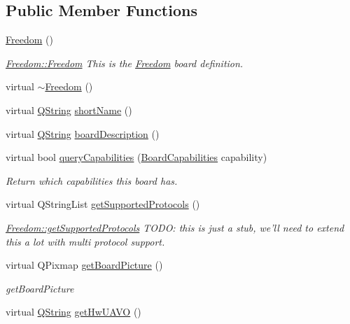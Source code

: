 \subsection*{\-Public \-Member \-Functions}
\begin{DoxyCompactItemize}
\item 
\hyperlink{group___boards___tau_labs_plugin_ga87f0c726ad13819e3918a3e270021fe9}{\-Freedom} ()
\begin{DoxyCompactList}\small\item\em \hyperlink{group___boards___tau_labs_plugin_ga87f0c726ad13819e3918a3e270021fe9}{\-Freedom\-::\-Freedom} \-This is the \hyperlink{class_freedom}{\-Freedom} board definition. \end{DoxyCompactList}\item 
virtual \hyperlink{group___boards___tau_labs_plugin_ga877df717ce1cf3c223d88f54ba538092}{$\sim$\-Freedom} ()
\item 
virtual \hyperlink{group___u_a_v_objects_plugin_gab9d252f49c333c94a72f97ce3105a32d}{\-Q\-String} \hyperlink{group___boards___tau_labs_plugin_ga430b08f4808aa122ae6f93fc1afd1ef5}{short\-Name} ()
\item 
virtual \hyperlink{group___u_a_v_objects_plugin_gab9d252f49c333c94a72f97ce3105a32d}{\-Q\-String} \hyperlink{group___boards___tau_labs_plugin_ga7668e232716f9de134cbcbb2936fda15}{board\-Description} ()
\item 
virtual bool \hyperlink{group___boards___tau_labs_plugin_ga9fe63b3e3b843bb34144942f4faafa3f}{query\-Capabilities} (\hyperlink{group___core_plugin_ga01b09218f2a13aaeee6db007ac6bd967}{\-Board\-Capabilities} capability)
\begin{DoxyCompactList}\small\item\em \-Return which capabilities this board has. \end{DoxyCompactList}\item 
virtual \-Q\-String\-List \hyperlink{group___boards___tau_labs_plugin_ga0666d1e73c1b7042303e2804c849420d}{get\-Supported\-Protocols} ()
\begin{DoxyCompactList}\small\item\em \hyperlink{group___boards___tau_labs_plugin_ga0666d1e73c1b7042303e2804c849420d}{\-Freedom\-::get\-Supported\-Protocols} \-T\-O\-D\-O\-: this is just a stub, we'll need to extend this a lot with multi protocol support. \end{DoxyCompactList}\item 
virtual \-Q\-Pixmap \hyperlink{group___boards___tau_labs_plugin_ga07d3982d49c35a87baa85e32af63e49c}{get\-Board\-Picture} ()
\begin{DoxyCompactList}\small\item\em get\-Board\-Picture \end{DoxyCompactList}\item 
virtual \hyperlink{group___u_a_v_objects_plugin_gab9d252f49c333c94a72f97ce3105a32d}{\-Q\-String} \hyperlink{group___boards___tau_labs_plugin_ga09397e9d9712878ddda4020b236f9ed5}{get\-Hw\-U\-A\-V\-O} ()
\end{DoxyCompactItemize}


